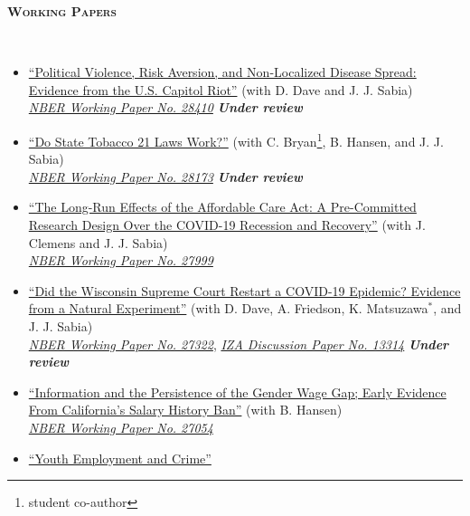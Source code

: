 \documentclass[11pt,english]{article}
\renewcommand{\section}[2]{
        \pagebreak[3]%
        \vspace{1.0\baselineskip}%
        \phantomsection\addcontentsline{toc}{section}{#1}%
        \hspace{0in}%
        {\raggedright \scshape \large \textbf{#1}}%
        \vspace{0.25\baselineskip}#2
}
\begin{document}
\section{Working Papers }\\
\vspace*{-.7cm}
\begin{itemize}[label={},itemindent=-2em,leftmargin=2em]


  \item \href{https://cheps.sdsu.edu/docs/Capitol_Riot_Risk%20Aversion_COVID-19_CHEPS_WP_2021201.pdf}{``Political Violence, Risk Aversion, and Non-Localized Disease Spread: Evidence from the U.S. Capitol Riot''}
(with D. Dave and J. J. Sabia)
\\ \href{https://www.nber.org/papers/w28410}{\emph{NBER Working Paper No. 28410}}
\textbf{ \emph{ Under review}}

  \item \href{https://cheps.sdsu.edu/_resources/docs/working-papers/cheps-working-paper-tobacco21.pdf}{``Do State Tobacco 21 Laws Work?''} (with C. Bryan\footnote[1]{student co-author}, B. Hansen, and J. J. Sabia)%
\\ \href{https://www.nber.org/papers/w28173}{\emph{NBER Working Paper No. 28173}}
\textbf{ \emph{ Under review}}

  \item \href{https://cheps.sdsu.edu/_resources/docs/working-papers/cheps-working-paper-affordable-care.pdf}{``The Long-Run Effects of the Affordable Care Act: A Pre-Committed Research Design Over the COVID-19 Recession and Recovery''} (with J. Clemens and J. J. Sabia)%
\\ \href{https://www.nber.org/papers/w27999}{\emph{ NBER Working Paper No. 27999}}


\item \href{https://cheps.sdsu.edu/_resources/docs/working-papers/cheps-working-paper-covid-wisconsin.pdf}{``Did the Wisconsin Supreme Court Restart a COVID-19 Epidemic? Evidence from a Natural Experiment''} (with D. Dave, A. Friedson, K. Matsuzawa$^*$, and J. J. Sabia)%
\\ \href{https://www.nber.org/papers/w27322}{\emph{ NBER Working Paper No. 27322}}, \href{https://www.iza.org/publications/dp/13314/did-the-wisconsin-supreme-court-restart-a-covid-19-epidemic-evidence-from-a-natural-experiment}{\emph{ IZA Discussion Paper No. 13314}}
\textbf{ \emph{ Under review}}

\item\href{https://drewmcnichols.github.io/salary_history_ban.pdf}{``Information and the Persistence of the Gender Wage Gap; Early Evidence From California's Salary History Ban''} (with B. Hansen) \\
\href{https://www.nber.org/papers/w27054}{\emph{ NBER Working Paper No. 27054}}

\item \href{https://drewmcnichols.github.io/youth_employment_and_crime.pdf}{``Youth Employment and Crime''}  \\
\end{itemize}
\vspace*{-1cm}
\end{document}
